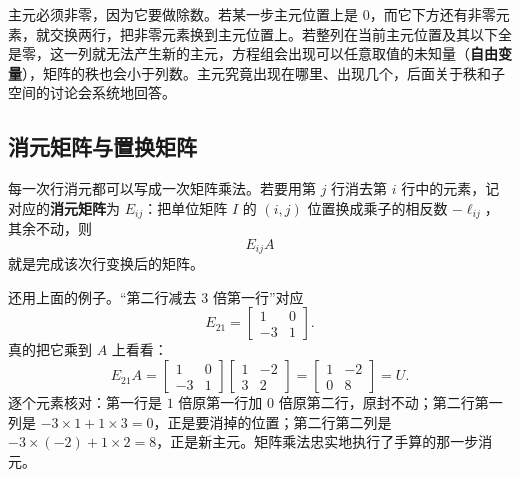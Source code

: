\documentclass[UTF8,a4paper,12pt]{ctexart}
\numberwithin{equation}{section}
\begin{document}
	主元必须非零，因为它要做除数。若某一步主元位置上是 $0$，而它下方还有非零元素，就交换两行，把非零元素换到主元位置上。若整列在当前主元位置及其以下全是零，这一列就无法产生新的主元，方程组会出现可以任意取值的未知量（\textbf{自由变量}），矩阵的秩也会小于列数。主元究竟出现在哪里、出现几个，后面关于秩和子空间的讨论会系统地回答。
	
	\subsection{消元矩阵与置换矩阵}
	
	每一次行消元都可以写成一次矩阵乘法。若要用第 $j$ 行消去第 $i$ 行中的元素，记对应的\textbf{消元矩阵}为 $E_{ij}$：把单位矩阵 $I$ 的 $(i,j)$ 位置换成乘子的相反数 $-\ell_{ij}$，其余不动，则
	\begin{equation}\label{eq:4.12}
	E_{ij}A
	\end{equation}
	就是完成该次行变换后的矩阵。
	
	还用上面的例子。“第二行减去 $3$ 倍第一行”对应
	\begin{equation}\label{eq:4.13}
	E_{21}=
	\begin{bmatrix}
		1&0\\
		-3&1
	\end{bmatrix}.
	\end{equation}
	真的把它乘到 $A$ 上看看：
	\begin{equation}\label{eq:4.14}
	E_{21}A
	=
	\begin{bmatrix}
		1&0\\
		-3&1
	\end{bmatrix}
	\begin{bmatrix}
		1&-2\\
		3&2
	\end{bmatrix}
	=
	\begin{bmatrix}
		1&-2\\
		0&8
	\end{bmatrix}
	=U.
	\end{equation}
	逐个元素核对：第一行是 $1$ 倍原第一行加 $0$ 倍原第二行，原封不动；第二行第一列是 $-3\times 1+1\times 3=0$，正是要消掉的位置；第二行第二列是 $-3\times(-2)+1\times 2=8$，正是新主元。矩阵乘法忠实地执行了手算的那一步消元。
	
\end{document}
